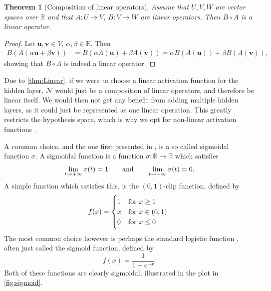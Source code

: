 \documentclass{article}
\newtheorem{theorem}{Theorem}[section]
\theoremstyle{definition}
\begin{document}
\begin{theorem}[Composition of linear operators]
    Assume that $U, V, W$ are vector spaces over $\mathbb{R}$ and that $A: U \to V$, $B: V \to W$ are linear operators. Then $B \circ A$ is a linear operator.
    \label{thm:Linear}
\end{theorem}
\begin{proof}
    Let $\boldsymbol{u}, \boldsymbol{v} \in V$, $\alpha, \beta \in \mathbb{R}$. Then
    \begin{align*}
        B(A(\alpha \boldsymbol{u} + \beta \boldsymbol{v})) &= B(\alpha A(\boldsymbol{u}) + \beta A(\boldsymbol{v}))
        = \alpha B(A(\boldsymbol{u})) + \beta B(A(\boldsymbol{v})),
    \end{align*}
    showing that $B \circ A$ is indeed a linear operator.
\end{proof}

Due to \autoref{thm:Linear}, if we were to choose a linear activation function for the hidden layer, $\mathcal{N}$ would just be a composition of linear operators, and therefore be linear itself. We would then not get any benefit from adding multiple hidden layers, as it could just be represented as one linear operation. This greatly restricts the hypothesis space, which is why we opt for non-linear activation functions \parencite[p.~72]{CholletFrancois2018DlwP}.

A common choice, and the one first presented in \textcite{universalapprox}, is a so called sigmoidal function $\sigma$. A sigmoidal function is a function $\sigma: \mathbb{R} \to \mathbb{R}$ which satisfies
\begin{equation*}
    \lim_{t \to +\infty} \sigma(t) = 1 \qquad \textnormal{and} \qquad \lim_{t \to -\infty} \sigma(t) = 0.
\end{equation*}
A simple function which satisfies this, is the $(0,1)$-clip function, defined by
\begin{equation*}
    f(x) = 
    \begin{cases}
        1 & \textnormal{for } x \geq 1 \\
        x & \textnormal{for } x \in (0,1) \\
        0 & \textnormal{for } x \leq 0
    \end{cases}.
\end{equation*}
The most common choice however is perhaps the standard logistic function \parencite{jentzen2023mathematical}, often just called the sigmoid function, defined by
\begin{equation*}
    f(x) = \frac{1}{1 + e^{-x}}.
\end{equation*}
Both of these functions are clearly sigmoidal, illustrated in the plot in \autoref{fig:sigmoid}.
\end{document}
